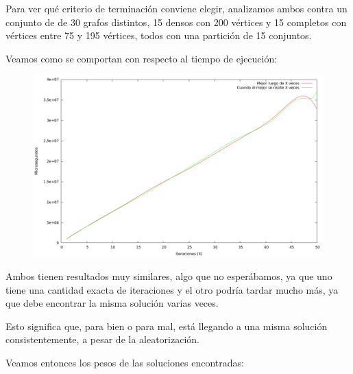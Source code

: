 Para ver qué criterio de terminación conviene elegir, analizamos ambos contra
un conjunto de de 30 grafos distintos, 15 densos con 200 vértices y 15 completos
con vértices entre 75 y 195 vértices, todos con una partición de 15 conjuntos.

Veamos como se comportan con respecto al tiempo de ejecución:

\vspace*{0.5cm}

\begin{figure}[H]
  \begin{center}
    \includegraphics[scale=0.35]{imagenes/grasp-criterio-tiempo.png}
  \end{center}
\end{figure}

\vspace*{0.5cm}

Ambos tienen resultados muy similares, algo que no esperábamos, ya que uno tiene
una cantidad exacta de iteraciones y el otro podría tardar mucho más, ya que
debe encontrar la misma solución varias veces.

Esto significa que, para bien o para mal, está llegando a una misma solución
consistentemente, a pesar de la aleatorización.

Veamos entonces los pesos de las soluciones encontradas:

\vspace*{0.5cm}

